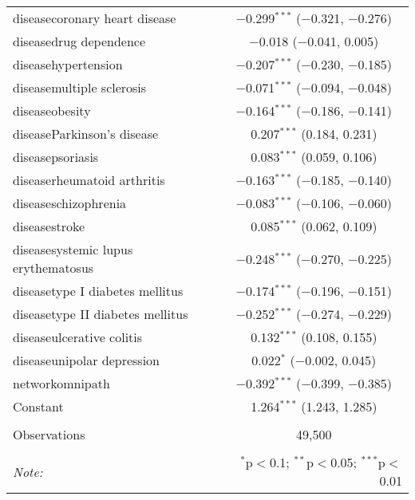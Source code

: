 \begin{table}[!htbp]
\begin{tabular}{@{\extracolsep{5pt}}lc}
  diseasecoronary heart disease & $-$0.299$^{***}$ ($-$0.321, $-$0.276) \\ 
  diseasedrug dependence & $-$0.018 ($-$0.041, 0.005) \\ 
  diseasehypertension & $-$0.207$^{***}$ ($-$0.230, $-$0.185) \\ 
  diseasemultiple sclerosis & $-$0.071$^{***}$ ($-$0.094, $-$0.048) \\ 
  diseaseobesity & $-$0.164$^{***}$ ($-$0.186, $-$0.141) \\ 
  diseaseParkinson's disease & 0.207$^{***}$ (0.184, 0.231) \\ 
  diseasepsoriasis & 0.083$^{***}$ (0.059, 0.106) \\ 
  diseaserheumatoid arthritis & $-$0.163$^{***}$ ($-$0.185, $-$0.140) \\ 
  diseaseschizophrenia & $-$0.083$^{***}$ ($-$0.106, $-$0.060) \\ 
  diseasestroke & 0.085$^{***}$ (0.062, 0.109) \\ 
  diseasesystemic lupus erythematosus & $-$0.248$^{***}$ ($-$0.270, $-$0.225) \\ 
  diseasetype I diabetes mellitus & $-$0.174$^{***}$ ($-$0.196, $-$0.151) \\ 
  diseasetype II diabetes mellitus & $-$0.252$^{***}$ ($-$0.274, $-$0.229) \\ 
  diseaseulcerative colitis & 0.132$^{***}$ (0.108, 0.155) \\ 
  diseaseunipolar depression & 0.022$^{*}$ ($-$0.002, 0.045) \\ 
  networkomnipath & $-$0.392$^{***}$ ($-$0.399, $-$0.385) \\ 
  Constant & 1.264$^{***}$ (1.243, 1.285) \\ 
 \hline \\[-1.8ex] 
Observations & 49,500 \\ 
\hline 
\hline \\[-1.8ex] 
\textit{Note:}  & \multicolumn{1}{r}{$^{*}$p$<$0.1; $^{**}$p$<$0.05; $^{***}$p$<$0.01} \\ 
\end{tabular} 
\end{table} 
